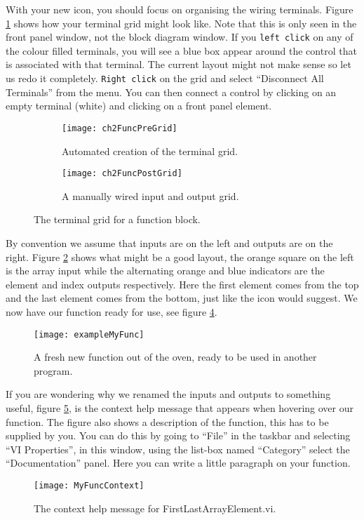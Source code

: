 With your new icon, you should focus on organising the wiring terminals. Figure \ref{ch2FuncPreGrid} shows how your terminal grid might look like. Note that this is only seen in the front panel window, not the block diagram window. If you \texttt{left click} on any of the colour filled terminals, you will see a blue box appear around the control that is associated with that terminal. The current layout might not make sense so let us redo it completely. \texttt{Right click} on the grid and select ``Disconnect All Terminals'' from the menu. You can then connect a control by clicking on an empty terminal (white) and clicking on a front panel element.
\begin{figure}
	\centering
	\begin{subfigure}[b]{0.40\textwidth}
		\centering
		\texttt{[image: ch2FuncPreGrid]}
		\caption{Automated creation of the terminal grid.}
		\label{ch2FuncPreGrid}
	\end{subfigure}
	\hfil
	\begin{subfigure}[b]{0.40\textwidth}
		\centering
		\texttt{[image: ch2FuncPostGrid]}
		\caption{A manually wired input and output grid.}
		\label{ch2FuncPostGrid}
	\end{subfigure}
	\caption{The terminal grid for a function block.}
	\label{terminals}
\end{figure}

By convention we assume that inputs are on the left and outputs are on the right. Figure \ref{ch2FuncPostGrid} shows what might be a good layout, the orange square on the left is the array input while the alternating orange and blue indicators are the element and index outputs respectively. Here the first element comes from the top and the last element comes from the bottom, just like the icon would suggest. We now have our function ready for use, see figure \ref{exampleMyFunc}.\\
\begin{figure}
	\centering
	\texttt{[image: exampleMyFunc]}
	\caption{A fresh new function out of the oven, ready to be used in another program.}
	\label{exampleMyFunc}
\end{figure}

If you are wondering why we renamed the inputs and outputs to something useful, figure \ref{MyFuncContext}, is the context help message that appears when hovering over our function. The figure also shows a description of the function, this has to be supplied by you. You can do this by going to ``File'' in the taskbar and selecting ``VI Properties'', in this window, using the list-box named ``Category'' select the ``Documentation'' panel. Here you can write a little paragraph on your function.
\begin{figure}
	\centering
	\texttt{[image: MyFuncContext]}
	\caption{The context help message for FirstLastArrayElement.vi.}
	\label{MyFuncContext}
\end{figure}


